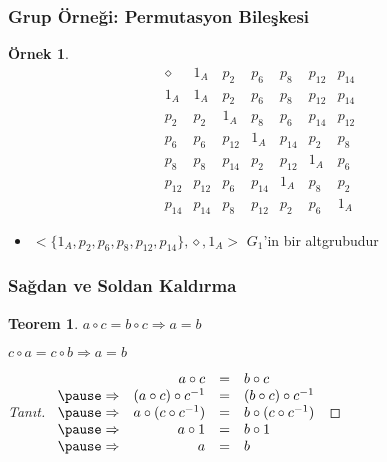 \documentclass[dvipsnames]{beamer}
\theoremstyle{definition}
\theoremstyle{example}
\newtheorem{ornek}[theorem]{Örnek}
\theoremstyle{plain}
\newtheorem{teorem}[theorem]{Teorem}
\begin{document}
\begin{frame}
  \frametitle{Grup Örneği: Permutasyon Bileşkesi}

  \begin{ornek}
    \[
      \begin{array}{c||c|c|c|c|c|c}
        \diamond & 1_{A}  & p_{2}  & p_{6}  & p_{8}  & p_{12} & p_{14}\\\hline\hline
        1_{A}    & 1_{A}  & p_{2}  & p_{6}  & p_{8}  & p_{12} & p_{14}\\\hline
        p_{2}    & p_{2}  & 1_{A}  & p_{8}  & p_{6}  & p_{14} & p_{12}\\\hline
        p_{6}    & p_{6}  & p_{12} & 1_{A}  & p_{14} & p_{2}  & p_{8}\\\hline
        p_{8}    & p_{8}  & p_{14} & p_{2}  & p_{12} & 1_{A}  & p_{6}\\\hline
        p_{12}   & p_{12} & p_{6}  & p_{14} & 1_{A}  & p_{8}  & p_{2}\\\hline
        p_{14}   & p_{14} & p_{8}  & p_{12} & p_{2}  & p_{6}  & 1_{A}
      \end{array}
    \]

    \bigskip
    \begin{itemize}
      \item $<\{1_A,p_2,p_6,p_8,p_{12},p_{14}\},\diamond,1_A>$
        $G_1$'in bir altgrubudur
    \end{itemize}
  \end{ornek}
\end{frame}

\begin{frame}
  \frametitle{Sağdan ve Soldan Kaldırma}

  \begin{teorem}
    $a \circ c = b \circ c \Rightarrow a = b$

    $c \circ a = c \circ b \Rightarrow a = b$
  \end{teorem}

  \pause
  \begin{proof}[Tanıt]
    $\begin{array}{crcl}
                  & a \circ c                & = & b \circ c\\ \pause
      \Rightarrow & (a \circ c) \circ c^{-1} & = & (b \circ c) \circ c^{-1}\\ \pause
      \Rightarrow & a \circ (c \circ c^{-1}) & = & b \circ (c \circ c^{-1})\\ \pause
      \Rightarrow & a \circ 1                & = & b \circ 1\\ \pause
      \Rightarrow & a                        & = & b
    \end{array}$

  \end{proof}
\end{frame}
\end{document}
